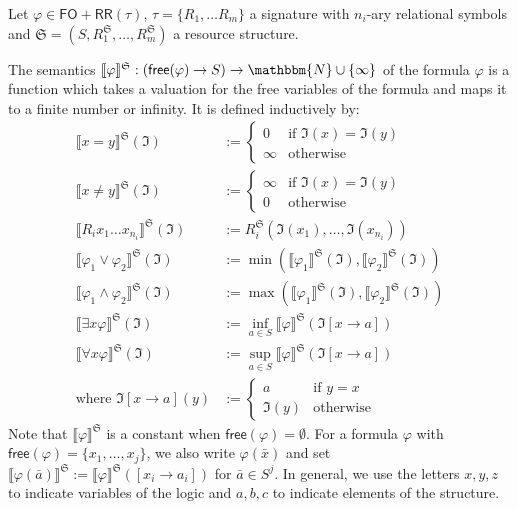 \documentclass{LMCS}
\newcommand{\nat}{\mathbbm{N}}
\newcommand{\natInf}{\nat \cup \{ \infty \}}
\newcommand{\semantics}[1]{\llbracket#1\rrbracket}
\newcommand{\structureS}{\mathfrak S}
\newcommand{\free}{\mathsf{free}}
\newcommand{\FORR}{\ensuremath{\mathsf{FO\!\!+\!\!RR}}}
\newcommand{\valfunc}{\mathfrak I}
\begin{document}
\begin{defi}[Semantics of \FORR{}]
  Let $\varphi \in \FORR(\tau)$, $\tau = \{ R_1, \ldots R_m\}$ a signature with
$n_i$-ary relational symbols and $\structureS =
(S,R_1^\structureS,\ldots,R_m^\structureS)$ a resource structure.

  The semantics $\semantics{\varphi}^\structureS : (\free(\varphi) \to S) \to
\natInf$ of the formula $\varphi$ is a function which takes a valuation for the
free variables of the formula and maps it to a finite number or infinity. It is
defined inductively by:
  \begin{align*}
	\semantics{x = y}^\structureS(\valfunc) &:= \begin{cases} 0 & \text{if }
\valfunc(x) = \valfunc(y) \\ \infty & \text{otherwise} \end{cases} \\
	\semantics{x \ne y}^\structureS(\valfunc) &:= \begin{cases} \infty & \text{if }
\valfunc(x) = \valfunc(y) \\ 0 & \text{otherwise} \end{cases} \\
	\semantics{R_ix_1\ldots x_{n_i}}^\structureS(\valfunc) &:=
R_i^\structureS(\valfunc(x_1),\ldots,\valfunc(x_{n_i})) \\
	\semantics{\varphi_1 \vee \varphi_2}^\structureS(\valfunc) &:=
\min(\semantics{\varphi_1}^\structureS(\valfunc),\semantics{\varphi_2}
^\structureS(\valfunc)) \\
	\semantics{\varphi_1 \wedge \varphi_2}^\structureS(\valfunc) &:=
\max(\semantics{\varphi_1}^\structureS(\valfunc),\semantics{\varphi_2}
^\structureS(\valfunc)) \\
	\semantics{\exists x \varphi}^\structureS(\valfunc) &:= \inf_{a \in S}
\semantics{\varphi}^\structureS(\valfunc[x \to a]) \\
	\semantics{\forall x \varphi}^\structureS(\valfunc) &:= \sup_{a \in S}
\semantics{\varphi}^\structureS(\valfunc[x \to a]) \\
	\text{where } \valfunc[x \to a](y) &:= \begin{cases} a & \text{if } y =
x \\ \valfunc(y) & \text{otherwise} \end{cases}
  \end{align*}
  Note that $\semantics{\varphi}^\structureS$ is a constant when
$\free(\varphi) = \emptyset$. For a formula
$\varphi$ with $\free(\varphi) = \{x_1,\ldots,x_j\}$, we 
also write $\varphi(\bar x)$ and set $\semantics{\varphi(\bar
a)}^\structureS := \semantics{\varphi}^\structureS([x_i \to a_i])$ for
$\bar a \in S^j$. In general, we use the letters $x,y,z$ to indicate
variables of the logic and $a,b,c$ to indicate elements of the structure. 
\end{defi}
\end{document}

